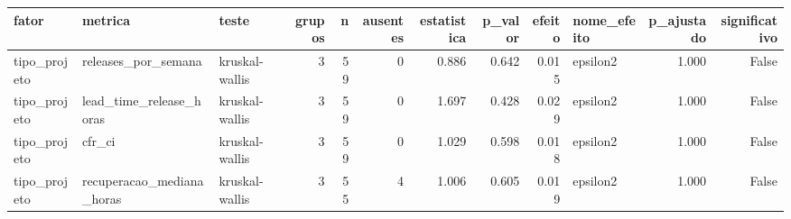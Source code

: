 \begin{tabular}{lllrrrrrrlrr}
\toprule
fator & metrica & teste & grupos & n & ausentes & estatistica & p_valor & efeito & nome_efeito & p_ajustado & significativo \\
\midrule
tipo_projeto & releases_por_semana & kruskal-wallis & 3 & 59 & 0 & 0.886 & 0.642 & 0.015 & epsilon2 & 1.000 & False \\
tipo_projeto & lead_time_release_horas & kruskal-wallis & 3 & 59 & 0 & 1.697 & 0.428 & 0.029 & epsilon2 & 1.000 & False \\
tipo_projeto & cfr_ci & kruskal-wallis & 3 & 59 & 0 & 1.029 & 0.598 & 0.018 & epsilon2 & 1.000 & False \\
tipo_projeto & recuperacao_mediana_horas & kruskal-wallis & 3 & 55 & 4 & 1.006 & 0.605 & 0.019 & epsilon2 & 1.000 & False \\
\bottomrule
\end{tabular}
